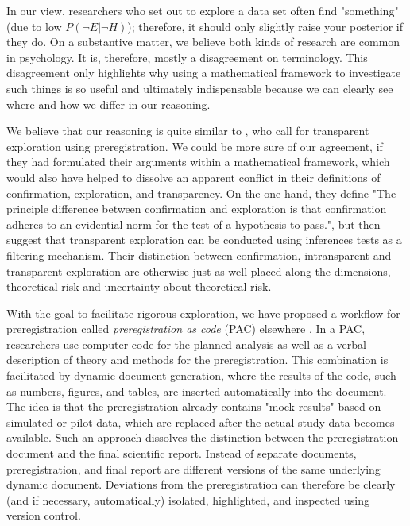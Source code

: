 \documentclass[jou,a4paper]{apa7}
\begin{document}
In our view, researchers who set out to explore a data set often find "something" (due to low $P(\neg E| \neg H)$); therefore, it should only slightly raise your posterior if they do.
On a substantive matter, we believe both kinds of research are common in psychology.
It is, therefore, mostly a disagreement on terminology.
This disagreement only highlights why using a mathematical framework to investigate such things is so useful and ultimately indispensable because we can clearly see where and how we differ in our reasoning.\par
We believe that our reasoning is quite similar to \textcite{hoflerMeansValuableExploration2022}, who call for transparent exploration using preregistration.
We could be more sure of our agreement, if they had formulated their arguments within a mathematical framework, which would also have helped to dissolve an apparent conflict in their definitions of confirmation, exploration, and transparency.
On the one hand, they define "The principle difference between confirmation and exploration is that confirmation adheres to an evidential norm for the test of a hypothesis to pass.", but then suggest that transparent exploration can be conducted using inferences tests as a filtering mechanism.
Their distinction between confirmation, intransparent and transparent exploration are otherwise just as well placed along the dimensions, theoretical risk and uncertainty about theoretical risk.\par
With the goal to facilitate rigorous exploration, we have proposed a workflow for preregistration called \textit{preregistration as code} (PAC) elsewhere \parencite{peikertReproducibleResearchTutorial2021}.
In a PAC, researchers use computer code for the planned analysis as well as a verbal description of theory and methods for the preregistration.
This combination is facilitated by dynamic document generation, where the results of the code, such as numbers, figures, and tables, are inserted automatically into the document.
The idea is that the preregistration already contains "mock results" based on simulated or pilot data, which are replaced after the actual study data becomes available.
Such an approach dissolves the distinction between the preregistration document and the final scientific report.
Instead of separate documents, preregistration, and final report are different versions of the same underlying dynamic document.
Deviations from the preregistration can therefore be clearly (and if necessary, automatically) isolated, highlighted, and inspected using version control.
\end{document}
